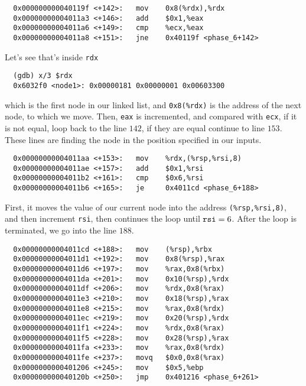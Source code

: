 {\renewcommand\fcolorbox[4][]{\textcolor{cyan}{\strut#4}}
\begin{verbatim}
  0x000000000040119f <+142>:   mov    0x8(%rdx),%rdx
  0x00000000004011a3 <+146>:   add    $0x1,%eax
  0x00000000004011a6 <+149>:   cmp    %ecx,%eax
  0x00000000004011a8 <+151>:   jne    0x40119f <phase_6+142>
\end{verbatim}
}\noindent
Let's see that's inside \verb|rdx|
{\renewcommand\fcolorbox[4][]{\textcolor{black}{\strut#4}}
\begin{verbatim}
  (gdb) x/3 $rdx
  0x6032f0 <node1>: 0x00000181 0x00000001 0x00603300
\end{verbatim}
}\noindent
which is the first node in our linked list, and \verb|0x8(%rdx)| is the address of the next node, to which we move. Then, \verb|eax| is incremented, and compared with \verb|ecx|, if it is not equal, loop back to the line $142$, if they are equal continue to line $153$. These lines are finding the node in the position specified in our inputs.
{\renewcommand\fcolorbox[4][]{\textcolor{cyan}{\strut#4}}
\begin{verbatim}
  0x00000000004011aa <+153>:   mov    %rdx,(%rsp,%rsi,8)
  0x00000000004011ae <+157>:   add    $0x1,%rsi
  0x00000000004011b2 <+161>:   cmp    $0x6,%rsi
  0x00000000004011b6 <+165>:   je     0x4011cd <phase_6+188>
\end{verbatim}
}\noindent
First, it moves the value of our current node into the address \verb|(%rsp,%rsi,8)|, and then increment \verb|rsi|, then continues the loop until $\verb|rsi| = 6$. After the loop is terminated, we go into the line $188$.
{\renewcommand\fcolorbox[4][]{\textcolor{cyan}{\strut#4}}
\begin{verbatim}
  0x00000000004011cd <+188>:   mov    (%rsp),%rbx
  0x00000000004011d1 <+192>:   mov    0x8(%rsp),%rax
  0x00000000004011d6 <+197>:   mov    %rax,0x8(%rbx)
  0x00000000004011da <+201>:   mov    0x10(%rsp),%rdx
  0x00000000004011df <+206>:   mov    %rdx,0x8(%rax)
  0x00000000004011e3 <+210>:   mov    0x18(%rsp),%rax
  0x00000000004011e8 <+215>:   mov    %rax,0x8(%rdx)
  0x00000000004011ec <+219>:   mov    0x20(%rsp),%rdx
  0x00000000004011f1 <+224>:   mov    %rdx,0x8(%rax)
  0x00000000004011f5 <+228>:   mov    0x28(%rsp),%rax
  0x00000000004011fa <+233>:   mov    %rax,0x8(%rdx)
  0x00000000004011fe <+237>:   movq   $0x0,0x8(%rax)
  0x0000000000401206 <+245>:   mov    $0x5,%ebp
  0x000000000040120b <+250>:   jmp    0x401216 <phase_6+261>
\end{verbatim}
}\noindent
